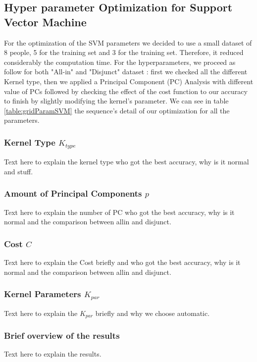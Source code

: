 \documentclass[conference]{IEEEtran}
\begin{document}
\subsection{Hyper parameter Optimization for Support Vector Machine}\label{sec:hyper:svm}
\textcolor{maxim}{
    For the optimization of the SVM parameters we decided to use a small dataset of 8 people, 5 for the training set and 3 for the training set. Therefore, it reduced considerably the computation time. For the hyperparameters, we proceed as follow for both "All-in" and "Disjunct" dataset : first we checked all the different Kernel type, then we applied a Principal Component (PC) Analysis with different value of PCs followed by checking the effect of the cost function to our accuracy to finish by slightly modifying the kernel's parameter. We can see in table \ref{table:gridParamSVM} the sequence's detail of our optimization for all the parameters.\\
    \subsubsection{Kernel Type $K_{type}$}
    Text here to explain the kernel type who got the best accuracy, why is it normal and stuff. \\
    \subsubsection{Amount of Principal Components $p$}
    Text here to explain the number of PC who got the best accuracy, why is it normal and the comparison between allin and disjunct. \\
    \subsubsection{Cost $C$}
    Text here to explain the Cost briefly and who got the best accuracy, why is it normal and the comparison between allin and disjunct. \\
    \subsubsection{Kernel Parameters $K_{par}$}
    Text here to explain the $K_{par}$ briefly and why we choose automatic.\\
    \subsubsection{Brief overview of the results}
    Text here to explain the results.\\
}
\end{document}
